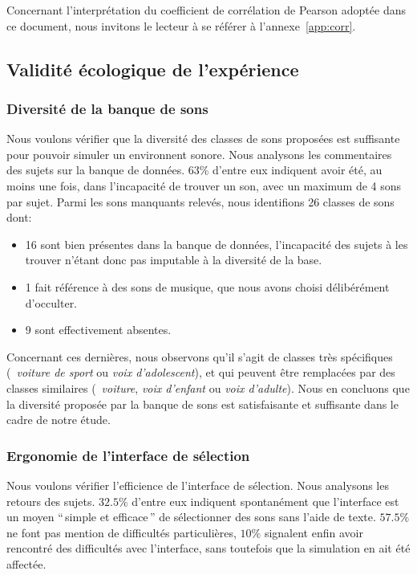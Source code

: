 Concernant l'interprétation du coefficient de corrélation de Pearson adoptée dans ce document, nous invitons le lecteur à se référer à l'annexe~\ref{app:corr}.

\subsection{Validité écologique de l'expérience}

\subsubsection{Diversité de la banque de sons}

Nous voulons vérifier que la diversité des classes de sons proposées est suffisante pour pouvoir simuler un environnent sonore. Nous analysons les commentaires des sujets sur la banque de données. 63\% d'entre eux indiquent avoir été, au moins une fois, dans l'incapacité de trouver un son, avec un maximum de 4 sons par sujet. Parmi les sons manquants relevés, nous identifions 26 classes de sons dont:

\begin{itemize}
\item 16 sont bien présentes dans la banque de données, l'incapacité des sujets à les trouver n'étant donc pas imputable à la diversité de la base.
\item 1 fait référence à des sons de musique, que nous avons choisi délibérément d'occulter. 
\item 9 sont effectivement absentes.  
\end{itemize}

Concernant ces dernières, nous observons qu'il s'agit de classes très spécifiques (\eg~\emph{voiture de sport} ou \emph{voix d'adolescent}), et qui peuvent être remplacées par des classes similaires (\eg~\emph{voiture}, \emph{voix d'enfant} ou \emph{voix d'adulte}). Nous en concluons que la diversité proposée par la banque de sons est satisfaisante et suffisante dans le cadre de notre étude.

\subsubsection{Ergonomie de l'interface de sélection}

Nous voulons vérifier l'efficience de l'interface de sélection. Nous analysons les retours des sujets. $32.5\%$ d'entre eux indiquent spontanément que l'interface est un moyen ``\,simple et efficace\,'' de sélectionner des sons sans l'aide de texte. $57.5\%$ ne font pas mention de difficultés particulières, $10\%$ signalent enfin avoir rencontré des difficultés avec l'interface, sans toutefois que la simulation en ait été affectée.

